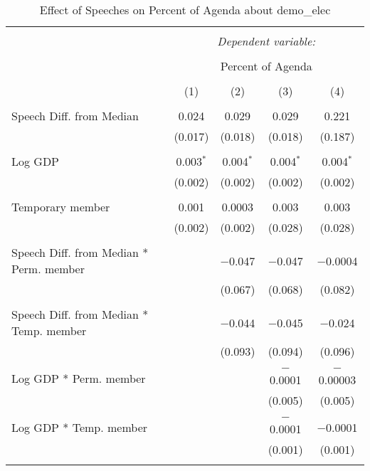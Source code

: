 
\begin{table}[!htbp] \centering 
  \caption{Effect of Speeches on Percent of Agenda about  demo_elec} 
  \label{} 
\begin{tabular}{@{\extracolsep{5pt}}lcccc} 
\\[-1.8ex]\hline 
\hline \\[-1.8ex] 
 & \multicolumn{4}{c}{\textit{Dependent variable:}} \\ 
\cline{2-5} 
\\[-1.8ex] & \multicolumn{4}{c}{Percent of Agenda} \\ 
\\[-1.8ex] & (1) & (2) & (3) & (4)\\ 
\hline \\[-1.8ex] 
 Speech Diff. from Median & 0.024 & 0.029 & 0.029 & 0.221 \\ 
  & (0.017) & (0.018) & (0.018) & (0.187) \\ 
  & & & & \\ 
 Log GDP & 0.003$^{*}$ & 0.004$^{*}$ & 0.004$^{*}$ & 0.004$^{*}$ \\ 
  & (0.002) & (0.002) & (0.002) & (0.002) \\ 
  & & & & \\ 
 Temporary member & 0.001 & 0.0003 & 0.003 & 0.003 \\ 
  & (0.002) & (0.002) & (0.028) & (0.028) \\ 
  & & & & \\ 
 Speech Diff. from Median * Perm. member &  & $-$0.047 & $-$0.047 & $-$0.0004 \\ 
  &  & (0.067) & (0.068) & (0.082) \\ 
  & & & & \\ 
 Speech Diff. from Median * Temp. member &  & $-$0.044 & $-$0.045 & $-$0.024 \\ 
  &  & (0.093) & (0.094) & (0.096) \\ 
  & & & & \\ 
 Log GDP * Perm. member &  &  & $-$0.0001 & $-$0.00003 \\ 
  &  &  & (0.005) & (0.005) \\ 
  & & & & \\ 
 Log GDP * Temp. member &  &  & $-$0.0001 & $-$0.0001 \\ 
  &  &  & (0.001) & (0.001) \\ 
  & & & & \\ 

\end{tabular}
\end{table}
